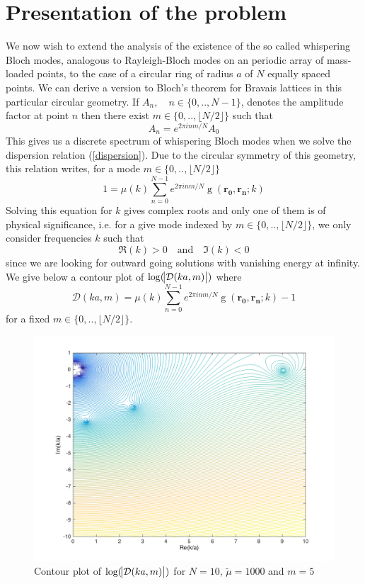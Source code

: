 \documentclass[11pt]{report}
\numberwithin{equation}{section}
\begin{document}
\section{Presentation of the problem}

We now wish to extend the analysis of the existence of the so called whispering Bloch modes, analogous to Rayleigh-Bloch modes on an periodic array of mass-loaded points, to the case of a circular ring of radius $a$ of $N$ equally spaced points. We can derive a version to Bloch's theorem for Bravais lattices in this particular circular geometry. If $A_n, \quad n \in \{0,..,N-1\}$, denotes the amplitude factor at point $n$ then there exist $m \in \{0,.., \lfloor N/2 \rfloor \}$ such that
%
\begin{equation}
    A_n = e^{2 \pi i n m / N}A_0
\end{equation}
%
This gives us a discrete spectrum of whispering Bloch modes when we solve the dispersion relation (\ref{dispersion}). Due to the circular symmetry of this geometry, this relation writes, for a mode $m \in \{0,.., \lfloor N/2 \rfloor \}$
%
\begin{equation}
    1 = \mu(k) \sum_{n=0}^{N-1} e^{2 \pi i n m / N} \operatorname{g}(\bm{r_0}, \bm{r_n};k)
\end{equation}
%
Solving this equation for $k$ gives complex roots and only one of them is of physical significance, i.e. for a give mode indexed by $m \in \{0,.., \lfloor N/2 \rfloor \}$, we only consider frequencies $k$ such that
%
\begin{equation}
    \Re(k) > 0 \quad \textrm{and} \quad \Im(k) < 0
\end{equation}
%
since we are looking for outward going solutions with vanishing energy at infinity. We give below a contour plot of $\log(\abs{\mathcal{D}(k a,m)})$ where
%
\begin{equation} \label{disp_whisp}
\mathcal{D}(k a,m) = \mu(k) \sum_{n=0}^{N-1} e^{2 \pi i n m / N} \operatorname{g}(\bm{r_0}, \bm{r_n};k) - 1
\end{equation}
%
for a fixed $m \in \{0,.., \lfloor N/2 \rfloor \}$.
%
\begin{figure} [H]
    \centering
    \includegraphics[width = 0.7 \textwidth]{Contour_disp}
    \caption{Contour plot of $\log(\abs{\mathcal{D}(k a,m)})$ for $N =10$, $\tilde{\mu}=1000$ and $m = 5$}
    \label{fig:my_label}
\end{figure}
\end{document}
